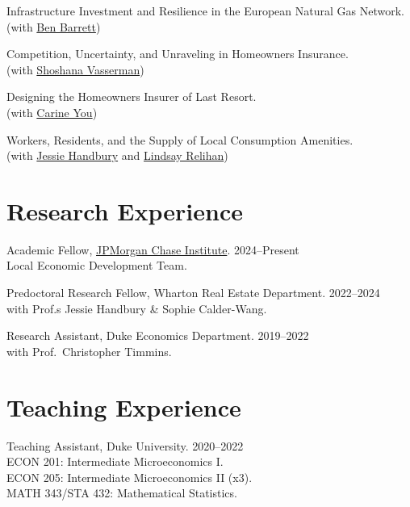 \documentclass[11pt, letterpaper]{article}
\begin{document}
Infrastructure Investment and Resilience in the European Natural Gas Network. \\
\hspace*{1.5em}(with \href{https://fabianbarrett.github.io/}{Ben Barrett})

Competition, Uncertainty, and Unraveling in Homeowners Insurance.\\
\hspace*{1.5em}(with \href{https://shoshanavasserman.com/}{Shoshana Vasserman})

Designing the Homeowners Insurer of Last Resort.\\
\hspace*{1.5em}(with \href{https://www.gsb.stanford.edu/programs/phd/academic-experience/students/carine-you}{Carine You})

Workers, Residents, and the Supply of Local Consumption Amenities. \\
\hspace*{1.5em}(with \href{http://jessiehandbury.com/}{Jessie Handbury} and \href{https://www.lindsayrelihan.com/}{Lindsay Relihan})

\section*{Research Experience}
Academic Fellow, \href{https://www.jpmorganchase.com/institute}{JPMorgan Chase Institute}. \hfill 2024--Present \\
\hspace*{1.5em}Local Economic Development Team.

Predoctoral Research Fellow, Wharton Real Estate Department. \hfill 2022--2024 \\
\hspace*{1.5em}with Prof.s Jessie Handbury \& Sophie Calder-Wang.

Research Assistant, Duke Economics Department. \hfill 2019--2022 \\
\hspace*{1.5em}with Prof.\ Christopher Timmins.

\section*{Teaching Experience}
Teaching Assistant, Duke University. \hfill 2020--2022 \\
\hspace*{1.5em}ECON 201: Intermediate Microeconomics I. \\
\hspace*{1.5em}ECON 205: Intermediate Microeconomics II (x3). \\
\hspace*{1.5em}MATH 343/STA 432: Mathematical Statistics.
\end{document}
